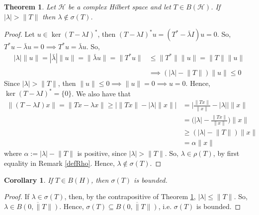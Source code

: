 \documentclass{report}
\newtheorem{thm}{Theorem}
\newtheorem{cor}{Corollary}
\begin{document}
\begin{thm} \label{SpectIsBd}
Let $\mathcal{H}$ be a complex Hilbert space and let $T \in B(\mathcal{H})$. If $|\lambda|>\|T\|$ then $\lambda \notin \sigma(T)$.
\end{thm}
\begin{proof}
  Let $u\in\operatorname{ker}(T-\lambda I)^{*}$, then $(T-\lambda I)^{*}u = (T^{*}-\bar{\lambda}I)u = 0$. So, $T^{*}u-\bar{\lambda}u = 0\implies T^{*}u = \bar{\lambda}u$. So,
  $$
  \begin{aligned}
    |\lambda|\lVert u\rVert = |\bar{\lambda}|\lVert u\rVert = \lVert\bar{\lambda}u\rVert = \lVert T^{*}u\rVert&\leq\lVert T^{*}\rVert\lVert u\rVert = \lVert T\rVert\lVert u\rVert\\\\
                                                                                                              &\implies (|\lambda|-\lVert T\rVert)\lVert u\rVert\leq 0
  \end{aligned}
  $$
  Since $|\lambda|>\lVert T\rVert$, then $\lVert u\rVert\leq 0\implies \lVert u\rVert = 0\implies u=0$. Hence, $\operatorname{ker}(T-\lambda I)^{*} = \{0\}$. We also have that
  $$
  \begin{aligned}
    \lVert (T-\lambda I)x\rVert = \rVert Tx-\lambda x\lVert\geq|\lVert Tx\rVert - |\lambda|\lVert x\rVert| &= \Big|\frac{\lVert Tx\rVert}{\lVert x\rVert} - |\lambda|\Big|\lVert x\rVert\\
                                                                                                           &= \Big(|\lambda|-\frac{\lVert Tx\rVert}{\lVert x\rVert}\Big)\lVert x\rVert\\
                                                                                                           &\geq (|\lambda|-\lVert T\lVert)\lVert x\rVert\\
                                                                                                           &= \alpha\lVert x\rVert
  \end{aligned}
  $$
  where $\alpha:=|\lambda|-\lVert T\rVert$ is positive, since $|\lambda|>\lVert T\rVert$. So, $\lambda\in\rho(T)$, by first equality in Remark \ref{defRho}. Hence, $\lambda\notin\sigma(T)$.
\end{proof}

\begin{cor} \label{SpectIsBd2}
  If $T\in B(H)$, then $\sigma(T)$ is bounded.
\end{cor}
\begin{proof}
  If $\lambda\in\sigma(T)$, then, by the contrapositive of Theorem \ref{SpectIsBd}, $|\lambda|\leq\lVert T\rVert$. So, $\lambda\in\overline{B(0,\lVert T\rVert)}$. Hence, $\sigma(T)\subseteq\overline{B(0,\lVert T\rVert)}$, i.e. $\sigma(T)$ is bounded.
\end{proof}
\end{document}
